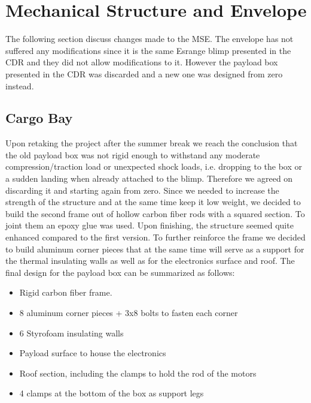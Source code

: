 \section{Mechanical Structure and Envelope}

The following section discuss changes made to the \ac{MSE}. The envelope has not suffered any modifications since it is the same Esrange blimp presented in the CDR and they did not allow modifications to it. However the payload box presented in the CDR was discarded and a new one was designed from zero instead. 

\subsection{Cargo Bay}
Upon retaking the project after the summer break we reach the conclusion that the old payload box was not rigid enough to withstand any moderate compression/traction load or unexpected shock loads, i.e. dropping to the box or a sudden landing when already attached to the blimp.  Therefore we agreed on discarding it and starting again from zero. 
Since we needed to increase the strength of the structure and at the same time keep it low weight, we decided to build the second frame out of hollow carbon fiber rods with a squared section. To joint them an epoxy glue was used. 
Upon finishing, the structure seemed quite enhanced compared to the first version. To further reinforce the frame we decided to build aluminum corner pieces that at the same time will serve as a support for the thermal insulating walls as well as for the electronics surface and roof. The final design for the payload box can be summarized as follows:

\begin{itemize}
\item Rigid carbon fiber frame.
\item 8 aluminum corner pieces + 3x8 bolts to fasten each corner
\item 6 Styrofoam insulating walls
\item Payload surface to house the electronics
\item Roof section, including the clamps to hold the rod of the motors
\item 4 clamps at the bottom of the box as support legs
\end{itemize}




